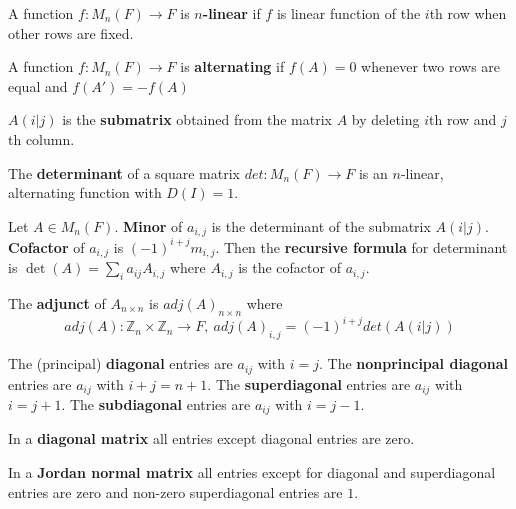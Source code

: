 \begin{definition}
	A function $f : M_n(F) \to F$ is \textbf{$n$-linear} if $f$ is linear function of the $i$th row when other rows are fixed.
\end{definition}

\begin{definition}
	A function $f : M_n(F) \to F$ is \textbf{alternating} if $f(A) = 0$ whenever two rows are equal and $f(A') = -f(A)$
\end{definition}

\begin{definition}
	$A(i|j)$ is the \textbf{submatrix} obtained from the matrix $A$ by deleting $i$th row and $j$th column.
\end{definition}
\begin{definition}
	The \textbf{determinant} of a square matrix $det : M_n(F) \to F$ is an $n$-linear, alternating function with $D(I) = 1$.
\end{definition}

\begin{definition}
	Let $A \in M_n(F)$.
	\textbf{Minor} of $a_{i,j}$ is the determinant of the submatrix $A(i|j)$.
	\textbf{Cofactor} of $a_{i,j}$ is $(-1)^{i+j} m_{i,j}$.
	Then the \textbf{recursive formula} for determinant is $\det(A) = \sum_{i} a_{ij} A_{i,j}$ where $A_{i,j}$ is the cofactor of $a_{i,j}$.
\end{definition}
\begin{definition}
	The \textbf{adjunct} of $A_{n \times n}$ is $adj(A)_{n \times n}$ where
		$$ adj(A) : \mathbb{Z}_{n} \times \mathbb{Z}_n \to F,\ adj(A)_{i,j} = (-1)^{i+j} det(A(i|j))$$
\end{definition}
\begin{definition}
	The (principal) \textbf{diagonal} entries are $a_{ij}$ with $i=j$.
	The \textbf{nonprincipal diagonal} entries are $a_{ij}$ with $i+j = n+1$.
	The \textbf{superdiagonal} entries are $a_{ij}$ with $i=j+1$.
	The \textbf{subdiagonal} entries are $a_{ij}$ with $i=j-1$.
\end{definition}
\begin{definition}
	In a \textbf{diagonal matrix} all entries except diagonal entries are zero.
\end{definition}
\begin{definition}
	In a \textbf{Jordan normal matrix} all entries except for diagonal and superdiagonal entries are zero and non-zero superdiagonal entries are $1$.
\end{definition}

